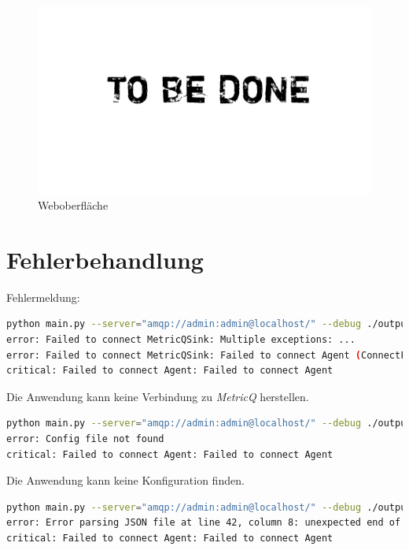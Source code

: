 \begin{figure}[H]
  \captionsetup{list=false} %
  \centering
  \includegraphics[width=\textwidth]{images/tbd.png}
  \caption{Weboberfläche} %
  \label{fig:checkmk_web_uebersicht}
\end{figure}

\section{Fehlerbehandlung}\label{sec:fehlerbehandlung}
Fehlermeldung:
\begin{lstlisting}[language=bash, caption=Verbindung fehlgeschlagen, label=lst:error-connect]
python main.py --server="amqp://admin:admin@localhost/" --debug ./output
error: Failed to connect MetricQSink: Multiple exceptions: ...
error: Failed to connect MetricQSink: Failed to connect Agent (ConnectFailed)
critical: Failed to connect Agent: Failed to connect Agent
\end{lstlisting}

\noindent
Die Anwendung kann keine Verbindung zu \textit{MetricQ} herstellen.

\begin{lstlisting}[language=bash, caption=Konfiguration nicht gefunden, label=lst:error-not-found]
python main.py --server="amqp://admin:admin@localhost/" --debug ./output
error: Config file not found
critical: Failed to connect Agent: Failed to connect Agent
\end{lstlisting}

\noindent
Die Anwendung kann keine Konfiguration finden.

\begin{lstlisting}[language=bash, caption=Fehler beim Parsen der Konfiguration, label=lst:error-json]
python main.py --server="amqp://admin:admin@localhost/" --debug ./output
error: Error parsing JSON file at line 42, column 8: unexpected end of JSON input
critical: Failed to connect Agent: Failed to connect Agent
\end{lstlisting}


